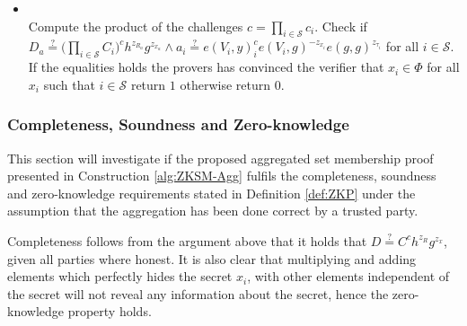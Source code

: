 \begin{algorithm}[]
\begin{itemize}
\item{} \\
Compute the product of the challenges $c=\prod_{i\in\mathcal{S}} c_i$. Check if $D_a\overset{?}{=} \big( \prod_{i\in\mathcal{S}}C_i\big)^ch^{z_R_a}g^{z_x_a}\wedge a_i \overset{?}{=} e(V_i,y)^c_i e(V_i,g)^{-z_{x_i}}e(g,g)^{z_{\tau_i}}$ for all $i\in\mathcal{S}$. If the equalities holds the provers has convinced the verifier that $x_i\in\Phi$ for all $x_i$ such that $i\in\mathcal{S}$ return $1$ otherwise return $0$.
\end{itemize}
\label{alg:ZKSM-Agg}
\end{algorithm} 
 

\subsubsection*{Completeness, Soundness and Zero-knowledge}
This section will investigate if the proposed aggregated set membership proof presented in Construction \ref{alg:ZKSM-Agg}  fulfils the completeness, soundness and zero-knowledge requirements stated in Definition \ref{def:ZKP} under the  assumption that the aggregation has been done correct by a trusted party. 

Completeness follows from the argument above that it holds that $D\overset{?}{=}C^ch^{z_R}g^{z_x}$, given all parties where honest. It is also clear that multiplying and adding elements which perfectly hides the secret $x_i$, with other elements independent of the secret will not reveal any information about the secret, hence the zero-knowledge property holds. 

